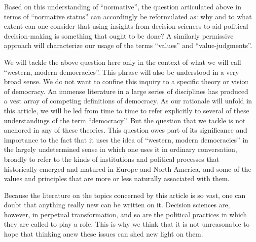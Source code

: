 \documentclass[preprint,11pt]{elsarticle}
\begin{document}
Based on this understanding of ``normative'', the question articulated above in terms of ``normative status'' can accordingly be reformulated as: why and to what extent can one consider that using insights from decision sciences to aid political decision-making is something that ought to be done? A similarly permissive approach will characterize our usage of the terms ``values'' and ``value-judgments''.

We will tackle the above question here only in the context of what we will call ``western, modern democracies''. This phrase will also be understood in a very broad sense. We do not want to confine this inquiry to a specific theory or vision of democracy. An immense literature in a large series of disciplines has produced a vest array of competing definitions of democracy. As our rationale will unfold in this article, we will be led from time to time to refer explicitly to several of these understandings of the term ``democracy''. But the question that we tackle is not anchored in any of these theories. This question owes part of its significance and importance to the fact that it uses the idea of “western, modern democracies” in the largely undetermined sense in which one uses it in ordinary conversation, broadly to refer to the kinds of institutions and political processes that historically emerged and matured in Europe and North-America, and some of the values and principles that are more or less naturally associated with them.

Because the literature on the topics concerned by this article is so vast, one can doubt that anything really new can be written on it. Decision sciences are, however, in perpetual transformation, and so are the political practices in which they are called to play a role. This is why we think that it is not unreasonable to hope that thinking anew these issues can shed new light on them.
\end{document}
